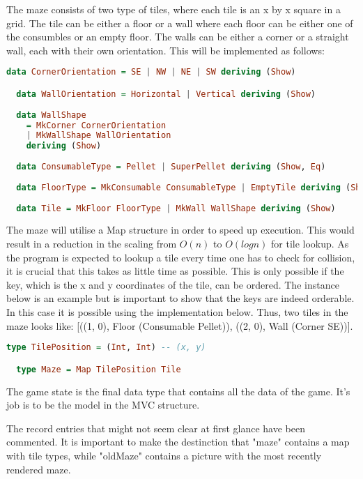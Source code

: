 \documentclass[11pt]{Article}
\begin{document}
\noindent The maze consists of two type of tiles, where each tile is an x by x square in a grid. The tile can be either a floor or a wall where each floor can be either one of the consumbles or an empty floor. The walls can be either a corner or a straight wall, each with their own orientation. This will be implemented as follows:
\begin{lstlisting}[language=Haskell]
  data CornerOrientation = SE | NW | NE | SW deriving (Show)

  data WallOrientation = Horizontal | Vertical deriving (Show)
  
  data WallShape
    = MkCorner CornerOrientation
    | MkWallShape WallOrientation
    deriving (Show)
  
  data ConsumableType = Pellet | SuperPellet deriving (Show, Eq)
  
  data FloorType = MkConsumable ConsumableType | EmptyTile deriving (Show)
  
  data Tile = MkFloor FloorType | MkWall WallShape deriving (Show)
\end{lstlisting}


The maze will utilise a Map structure in order to speed up execution. This would result in a reduction in the scaling from $O(n)$ to $O(logn)$ for tile lookup. As the program is expected to lookup a tile every time one has to check for collision, it is crucial that this takes as little time as possible. This is only possible if the key, which is the x and y coordinates of the tile, can be ordered. The instance below is an example but is important to show that the keys are indeed orderable. In this case it is possible using the implementation below. Thus, two tiles in the maze looks like: [((1, 0), Floor (Consumable Pellet)), ((2, 0), Wall (Corner SE))]. 

\begin{lstlisting}[language=Haskell]
  type TilePosition = (Int, Int) -- (x, y)

  type Maze = Map TilePosition Tile
\end{lstlisting}

\newpage
The game state is the final data type that contains all the data of the game. It's job is to be the model in the MVC structure. 

The record entries that might not seem clear at first glance have been commented. It is important to make the destinction that "maze" contains a map with tile types, while "oldMaze" contains a picture with the most recently rendered maze.
\end{document}
